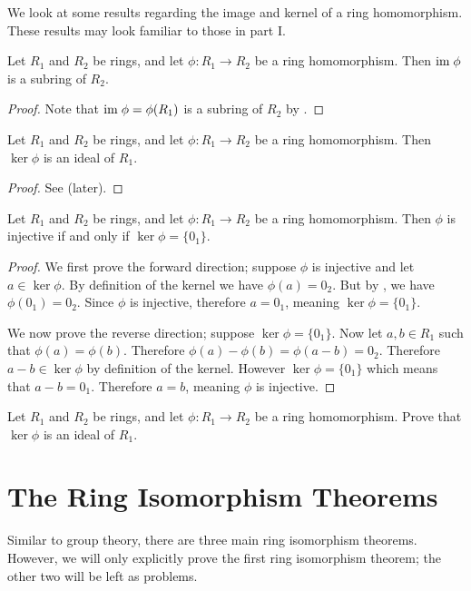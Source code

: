 We look at some results regarding the image and kernel of a ring homomorphism. These results may look familiar to those in part I.
\begin{proposition}\label{prop-image-is-a-subring}
    Let $R_1$ and $R_2$ be rings, and let $\phi: R_1 \to R_2$ be a ring homomorphism. Then $\mathrm{im}\;\phi$ is a subring of $R_2$.
\end{proposition}
\begin{proof}
    Note that $\mathrm{im}\;\phi = \phi(R_1)$ is a subring of $R_2$ by .
\end{proof}

\begin{proposition}\label{prop-kernel-is-an-ideal}
    Let $R_1$ and $R_2$ be rings, and let $\phi: R_1 \to R_2$ be a ring homomorphism. Then $\ker\phi$ is an ideal of $R_1$.
\end{proposition}
\begin{proof}
    See  (later).
\end{proof}

\begin{proposition}
    Let $R_1$ and $R_2$ be rings, and let $\phi: R_1 \to R_2$ be a ring homomorphism. Then $\phi$ is injective if and only if $\ker\phi = \{0_1\}$.
\end{proposition}
\begin{proof}
    We first prove the forward direction; suppose $\phi$ is injective and let $a \in \ker\phi$. By definition of the kernel we have $\phi(a) = 0_2$. But by , we have $\phi(0_1) = 0_2$. Since $\phi$ is injective, therefore $a = 0_1$, meaning $\ker\phi = \{0_1\}$.

    We now prove the reverse direction; suppose $\ker\phi = \{0_1\}$. Now let $a,b \in R_1$ such that $\phi(a) = \phi(b)$. Therefore $\phi(a) - \phi(b) = \phi(a-b) = 0_2$. Therefore $a-b \in \ker\phi$ by definition of the kernel. However $\ker\phi = \{0_1\}$ which means that $a - b = 0_1$. Therefore $a = b$, meaning $\phi$ is injective.
\end{proof}

\begin{exercise}\label{exercise-kernel-is-an-ideal}
    Let $R_1$ and $R_2$ be rings, and let $\phi: R_1 \to R_2$ be a ring homomorphism. Prove that $\ker\phi$ is an ideal of $R_1$.
\end{exercise}

\section{The Ring Isomorphism Theorems}
Similar to group theory, there are three main ring isomorphism theorems. However, we will only explicitly prove the first ring isomorphism theorem; the other two will be left as problems.



